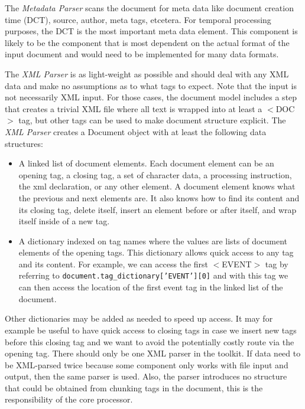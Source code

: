 \documentclass[11pt]{article}
\newcommand{\tag}[1]{$<$#1$>$}
\begin{document}
The {\em Metadata Parser} scans the document for meta data like document creation time (DCT), source, author, meta tags, etcetera. For temporal processing purposes, the DCT is the most important meta data element. This component is likely to be the component that is most dependent on the actual format of the input document and would need to be implemented for many data formats. 

The {\em XML Parser} is as light-weight as possible and should deal with any XML data and make no assumptions as to what tags to expect. Note that the input is not necessarily XML input. For those cases, the document model includes a step that creates a trivial XML file where all text is wrapped into at least a \tag{DOC} tag, but other tags can be used to make document structure explicit. The {\em XML Parser} creates a Document object with at least the following data structures:

\begin{itemize}

\item
A linked list of document elements. Each document element can be an opening tag, a closing tag, a set of character data, a processing instruction, the xml declaration, or any other element. A document element knows what the previous and next elements are. It also knows how to find its content and its closing tag, delete itself, insert an element before or after itself, and wrap itself inside of a new tag.

\item
A dictionary indexed on tag names where the values are lists of document elements of the opening tags. This dictionary allows quick access to any tag and its content. For example, we can access the first \tag{EVENT} tag by referring to {\tt document.tag\_dictionary['EVENT'][0]} and with this tag we can then access the location of the first event tag in the linked list of the document.

\end{itemize}

Other dictionaries may be added as needed to speed up access. It may for example be useful to have quick access to closing tags in case we insert new tags before this closing tag and we want to avoid the potentially costly route via the opening tag. There should only be one XML parser in the toolkit. If data need to be XML-parsed twice because some component only works with file input and output, then the same parser is used. Also, the parser introduces no structure that could be obtained from chunking tags in the document, this is the responsibility of the core processor.
\end{document}
